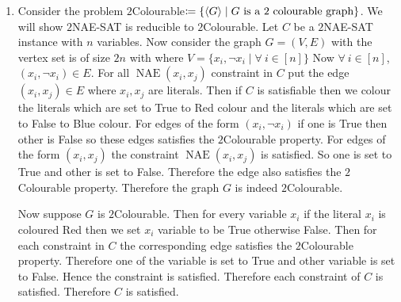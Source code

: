 \documentclass[a4paper, 11pt]{article}
\DeclareMathOperator{\nae}{NAE}
\begin{document}
{\begin{enumerate}[label=(\alph*)]
 Let $\nae(w,x,y,z)\text{ is satisfiable}$. Then there is at least one variable set to True and at least one variable set to False. Now there are two possible case. One of th pairs $\{\{w,x\},\{y,z\}\}$ set to same value. WLOG suppose $w,x$ set to same value. Then $y,z$ are set to different values. Hence in $\nae(\neg a,y,z)$, $a$ can be set to any value but in $\nae(w,x,a)$ since both $w,x$ are set to same value $a$ has to be set the other. This way both $\nae(w,x,a)$ and $\nae(\neg a,y,z)$ are satisfied. If all the pairs in $\{\{w,x\},\{y,z\}\}$ are set to different values then $w,x$ are set to different values and $y,z$ are set to different values. Hence for any value of $a$ both $\nae(w,x,a)$ and $\nae(\neg a,y,z)$ are satisfied.  Therefore  $\nae(w,x,a)\wedge \nae(\neg a,y,z)$ is satisfied.
 
 Now let $\nae(w,x,a)\wedge \nae(\neg a,y,z)$ is satisfied. WLOG suppose $a$ is set to be True. Then $w,x$ are set to different values. Therefore in $w,x,y,z$ there is at least one variable set to True and one variable set to False. Therefore $\nae(w,x,y,z)$ is satisfied.
 
 Therefore this gives a polynomial-time many-one reduction from $4$NAE-SAT to $3$NAE-SAT.
 \item Consider the problem $2$Colourable$\coloneqq \{\langle G\rangle \mid G\text{ is a 2 colourable graph}\}$. We will show $2$NAE-SAT is reducible to $2$Colourable. Let $C$ be a $2$NAE-SAT instance with $n$ variables. Now consider the graph $G=(V,E)$ with the vertex set is of size $2n$ with where $V=\{x_i,\neg x_i\mid \forall\ i\in[n]\}$ Now $\forall\ i\in[n]$, $(x_i,\neg x_i)\in E$. For all $\nae(x_i,x_j)$ constraint in $C$ put the edge $(x_i,x_j)\in E$ where $x_i,x_j$ are literals.  Then if $C$ is satisfiable then we colour  the literals which are set to True to Red colour and the literals which are set to False to Blue colour. For edges of the form $(x_i,\neg x_i)$ if one is True then other is False so these edges satisfies the $2$Colourable property. For edges of the form $(x_i,x_j)$ the constraint $\nae(x_i,x_j)$ is satisfied. So one is set to True and other is set to False. Therefore the edge also satisfies the $2$Colourable property. Therefore the graph $G$ is indeed $2$Colourable.\parinn
 
 Now suppose $G$ is $2$Colourable. Then for every variable $x_i$ if the literal $x_i$ is coloured Red then we set $x_i$ variable to be True otherwise False. Then for each constraint in $C$ the corresponding edge satisfies the $2$Colourable property. Therefore one of the variable is set to True and other variable is set to False. Hence the constraint is satisfied. Therefore each constraint of $C$ is satisfied. Therefore $C$ is satisfied.
 

\end{enumerate}}
\end{document}
